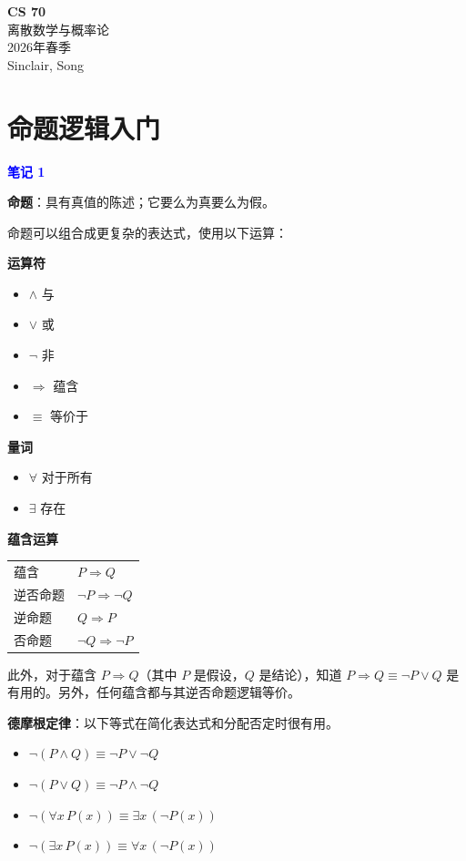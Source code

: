 \documentclass[11pt]{article}
\begin{document}
\begin{center}
{\Large\bfseries CS 70}\\[0.2em]
离散数学与概率论\\[0.1em]
2026年春季\\[0.1em]
Sinclair, Song\\[0.5em]
\end{center}

\section*{命题逻辑入门}

\textcolor{blue}{\textbf{笔记 1}}

\textbf{命题}：具有真值的陈述；它要么为真要么为假。

命题可以组合成更复杂的表达式，使用以下运算：

\textbf{运算符}
\begin{itemize}
\item $\land$ 与
\item $\lor$ 或
\item $\neg$ 非
\item $\Rightarrow$ 蕴含
\item $\equiv$ 等价于
\end{itemize}

\textbf{量词}
\begin{itemize}
\item $\forall$ 对于所有
\item $\exists$ 存在
\end{itemize}

\textbf{蕴含运算}

\begin{tabular}{ll}
蕴含 & $P \Rightarrow Q$ \\
逆否命题 & $\neg P \Rightarrow \neg Q$ \\
逆命题 & $Q \Rightarrow P$ \\
否命题 & $\neg Q \Rightarrow \neg P$
\end{tabular}

此外，对于蕴含 $P \Rightarrow Q$（其中 $P$ 是假设，$Q$ 是结论），知道 $P \Rightarrow Q \equiv \neg P \lor Q$ 是有用的。另外，任何蕴含都与其逆否命题逻辑等价。

\textbf{德摩根定律}：以下等式在简化表达式和分配否定时很有用。
\begin{itemize}
\item $\neg(P \land Q) \equiv \neg P \lor \neg Q$
\item $\neg(P \lor Q) \equiv \neg P \land \neg Q$
\item $\neg(\forall x\, P(x)) \equiv \exists x\, (\neg P(x))$
\item $\neg(\exists x\, P(x)) \equiv \forall x\, (\neg P(x))$
\end{itemize}
\end{document}
